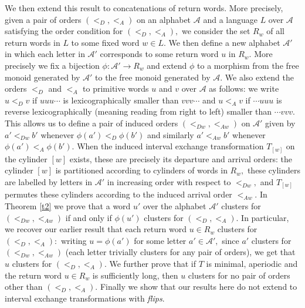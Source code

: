 \documentclass[12pt,a4paper]{amsart}
\begin{document}
 We then extend this result to concatenations of return words. More precisely, given a pair of orders   $(<_D,<_A)$ on an alphabet $\mathcal A$ and a language $L$ over $\mathcal A$ satisfying the order condition for $(<_D,<_A),$  we consider the set $R_w$ of all  return words in $L$ to some fixed word $w\in L.$ We then define a new alphabet $\mathcal A'$ in which each letter in $\mathcal A'$ corresponds to some return word  $u$ in $R_w.$ More precisely we fix a bijection $\phi: \mathcal A' \rightarrow R_w$ and extend $\phi$ to a morphism from the free monoid generated by $\mathcal A'$ to the free monoid generated by $\mathcal A.$  We also extend the orders $<_D$ and $<_A$ to primitive words $u$ and $v$ over $\mathcal A$ as follows: we write $u<_D v$  if $uuu\cdots $ is lexicographically smaller than $vvv\cdots$ and $u<_A v$ if $\cdots uuu$ is reverse lexicographically (meaning reading from right to left) smaller than $\cdots vvv.$ This allows us to define a pair of induced orders $(<_{Dw}, <_{Aw})$  on $\mathcal A'$ given  by $a'<_{Dw} b' $ whenever $\phi(a') <_D \phi(b')$ and similarly  $a'<_{Aw} b' $ whenever $\phi(a') <_A \phi(b').$  When  the induced interval exchange transformation $T_{[w]}$ on the cylinder $[w]$ exists, these are precisely its departure and arrival orders: the cylinder $[w]$ is partitioned according to cylinders of  words in $R_w,$ these cylinders are labelled by letters in $\mathcal A'$ in increasing order with respect to $<_{Dw},$ and $T_{[w]}$ permutes these cylinders according to the induced arrival order $<_{Aw}.$ In Theorem \ref{t2} we prove that a word $u'$ over the alphabet $\mathcal A'$ clusters for $(<_{Dw}, <_{Aw})$ if and only if $\phi(u')$ clusters for $(<_D, <_A).$  In particular, we recover our earlier result  that each return word $u\in R_w$ clusters for $(<_D, <_A):$ writing $u=\phi(a')$ for some letter $a'\in \mathcal A',$  since $a'$ clusters for $(<_{Dw}, <_{Aw})$ (each letter trivially clusters for any pair of orders),  we get that $u$ clusters for $(<_D, <_A).$ 
 We further prove that if $T$ is minimal, aperiodic and the return word $u\in R_w$ is sufficiently long, then $u$ clusters for no pair of orders other than $(<_D, <_A).$ Finally we  show that our results here do not extend to interval exchange transformations with {\it flips}. \\
 
\end{document}

